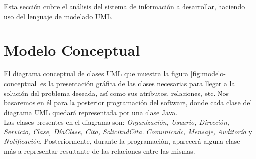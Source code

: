 


Esta sección cubre el análisis del sistema de información a desarrollar, haciendo uso del lenguaje de modelado UML.

\section{Modelo Conceptual} \label{sec:modelo-conceptual}

El diagrama conceptual de clases UML que muestra la figura \ref{fig:modelo-conceptual} es la presentación gráfica de las clases necesarias para llegar a la solución del problema deseada, así como sus atributos, relaciones, etc. Nos basaremos en él para la posterior programación del software, donde cada clase del diagrama UML quedará representada por una clase Java. \\

Las clases presentes en el diagrama son: \textit{Organización, Usuario, Dirección, Servicio, Clase, DíaClase, Cita, SolicitudCita. Comunicado, Mensaje, Auditoría} y \textit{Notificación}. Posteriormente, durante la programación, aparecerá alguna clase más a representar resultante de las relaciones entre las mismas. 


\vspace{15mm}

